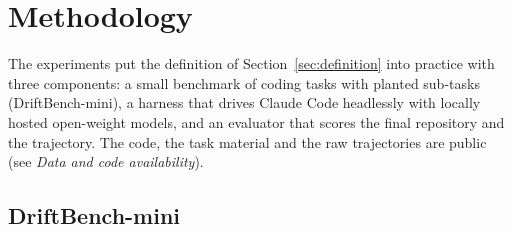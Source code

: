 \section{Methodology}
\label{sec:method}

The experiments put the definition of Section~\ref{sec:definition} into practice with three
components: a small benchmark of coding tasks with planted sub-tasks (DriftBench-mini), a harness
that drives Claude Code headlessly with locally hosted open-weight models, and an evaluator that
scores the final repository and the trajectory. The code, the task material and the raw trajectories
are public (see \emph{Data and code availability}).

\subsection{DriftBench-mini}
\label{sec:bench}

